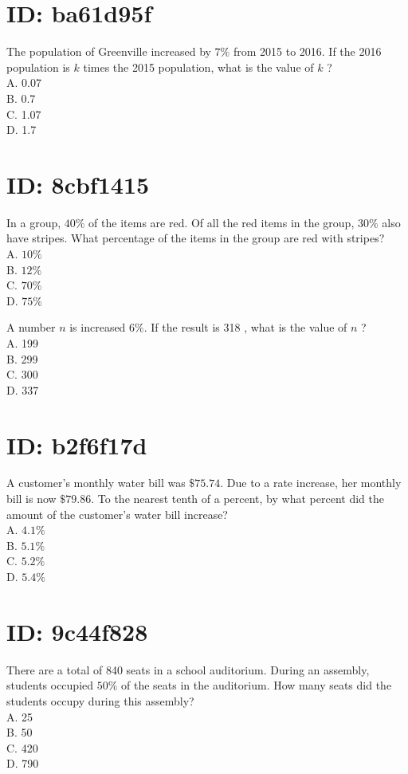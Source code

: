 \section*{ID: ba61d95f}
The population of Greenville increased by $7 \%$ from 2015 to 2016. If the 2016 population is $k$ times the 2015 population, what is the value of $k$ ?\\
A. 0.07\\
B. 0.7\\
C. 1.07\\
D. 1.7

\section*{ID: 8cbf1415}
In a group, $40 \%$ of the items are red. Of all the red items in the group, $30 \%$ also have stripes. What percentage of the items in the group are red with stripes?\\
A. $10 \%$\\
B. $12 \%$\\
C. $70 \%$\\
D. $75 \%$

A number $n$ is increased $6 \%$. If the result is 318 , what is the value of $n$ ?\\
A. 199\\
B. 299\\
C. 300\\
D. 337

\section*{ID: b2f6f17d}
A customer's monthly water bill was $\$ 75.74$. Due to a rate increase, her monthly bill is now $\$ 79.86$. To the nearest tenth of a percent, by what percent did the amount of the customer's water bill increase?\\
A. $4.1 \%$\\
B. $5.1 \%$\\
C. $5.2 \%$\\
D. $5.4 \%$

\section*{ID: 9c44f828}
There are a total of 840 seats in a school auditorium. During an assembly, students occupied $50 \%$ of the seats in the auditorium. How many seats did the students occupy during this assembly?\\
A. 25\\
B. 50\\
C. 420\\
D. 790

